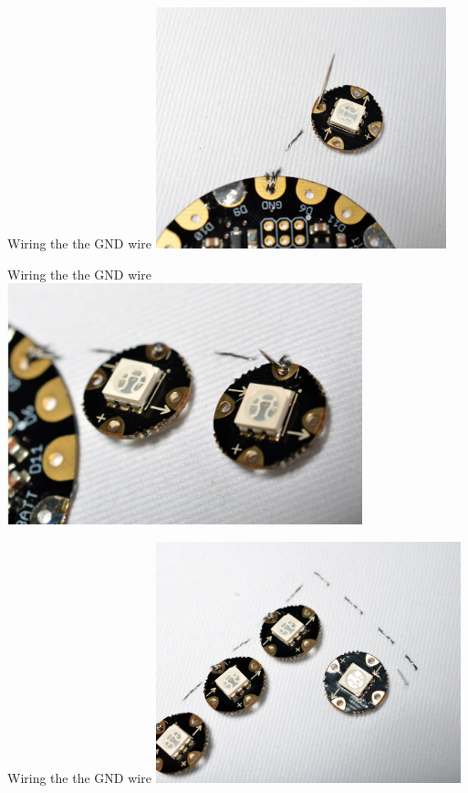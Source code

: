 \documentclass[aspectratio=169]{beamer}
\begin{document}
\begin{frame}[fragile]{Wiring the the GND wire}
\includegraphics[height=2.75in]{flora_DSC_0113.jpg}
\end{frame}
\begin{frame}[fragile]{Wiring the the GND wire}
\includegraphics[height=2.75in]{flora_DSC_0115.jpg}
\end{frame}
\begin{frame}[fragile]{Wiring the the GND wire}
\includegraphics[height=2.75in]{flora_DSC_0116.jpg}
\end{frame}
\end{document}
